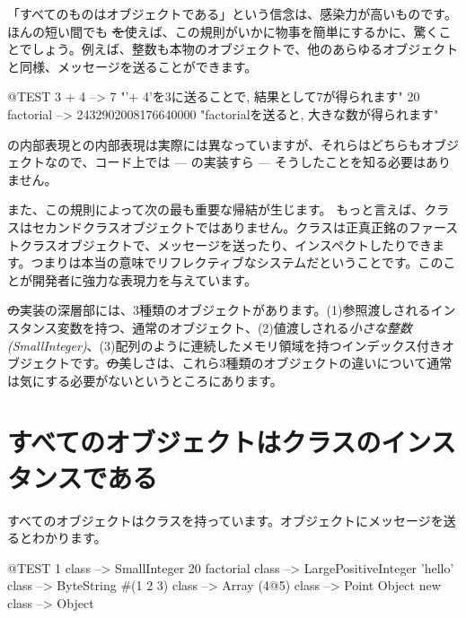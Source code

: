 \documentclass[a4paper,10pt,twoside]{book}
\begin{document}

「すべてのものはオブジェクトである」という信念は、感染力が高いものです。ほんの短い間でも \st を使えば、この規則がいかに物事を簡単にするかに、驚くことでしょう。例えば、整数も本物のオブジェクトで、他のあらゆるオブジェクトと同様、メッセージを送ることができます。

\begin{code}{@TEST}
3 + 4            --> 7    "'+ 4'を3に送ることで, 結果として7が得られます"
20 factorial  --> 2432902008176640000   "factorialを送ると, 大きな数が得られます"
\end{code}

の内部表現との内部表現は実際には異なっていますが、それらはどちらもオブジェクトなので、コード上では --- の実装すら --- そうしたことを知る必要はありません。

また、この規則によって次の最も重要な帰結が生じます。
もっと言えば、クラスはセカンドクラスオブジェクトではありません。クラスは正真正銘のファーストクラスオブジェクトで、メッセージを送ったり、インスペクトしたりできます。つまり\pharo は本当の意味でリフレクティブなシステムだということです。このことが開発者に強力な表現力を与えています。

\st の実装の深層部には、3種類のオブジェクトがあります。(1)参照渡しされるインスタンス変数を持つ、通常のオブジェクト、(2)値渡しされる\emph{小さな整数(SmallInteger)}、(3)配列のように連続したメモリ領域を持つインデックス付きオブジェクトです。\st の美しさは、これら3種類のオブジェクトの違いについて通常は気にする必要がないというところにあります。

\section{すべてのオブジェクトはクラスのインスタンスである}


すべてのオブジェクトはクラスを持っています。オブジェクトにメッセージを送るとわかります。

\begin{code}{@TEST}
1 class                 --> SmallInteger
20 factorial class --> LargePositiveInteger
'hello' class          --> ByteString
#(1 2 3) class       --> Array
(4@5) class         --> Point
Object new class --> Object
\end{code}
\end{document}
